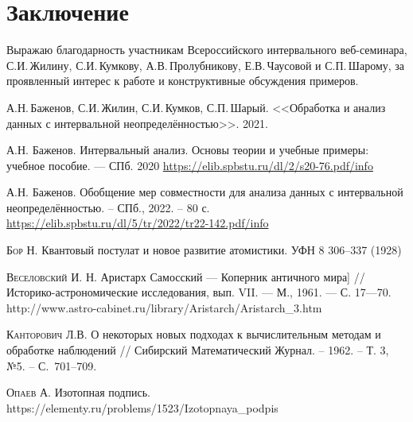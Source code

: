\documentclass[a5paper,openany]{book}
\begin{document}
\chapter*{Заключение}\label{Conclusion}


Выражаю благодарность участникам Всероссийского интервального веб-семинара, С.И.\,Жилину, С.И.\,Кумкову, А.В.\,Пролубникову, Е.В.\,Чаусовой  и С.П.\,Шарому, за проявленный интерес к работе и конструктивные обсуждения примеров. 





\begin{thebibliography}{00}


	 А.Н.\,Баженов, С.И.\,Жилин, С.И.\,Кумков, С.П.\,Шарый. <<Обработка и анализ данных с интервальной неопределённостью>>. 2021.

	А.Н. Баженов. Интервальный анализ. Основы теории и учебные примеры: учебное пособие. --- СПб. 2020
	\url{https://elib.spbstu.ru/dl/2/s20-76.pdf/info}
	
	А.Н. Баженов. Обобщение мер совместности для анализа данных с интервальной неопределённостью. – СПб., 2022. – 80 с.
	\url{https://elib.spbstu.ru/dl/5/tr/2022/tr22-142.pdf/info}

	\textsc{Бор Н.} Квантовый постулат и новое развитие атомистики. УФН 8 306–337 (1928)
	
	 \textsc{Веселовский И. Н.}
Аристарх Самосский — Коперник античного мира] // Историко-астрономические исследования, вып. VII. — М., 1961. — С. 17—70. \\
http://www.astro-cabinet.ru/library/Aristarch/Aristarch\_3.htm 
	
	
	
	\textsc{Канторович Л.В.} О некоторых новых подходах к вычислительным методам и обработке 
	наблюдений // Сибирский Математический Журнал. -- 1962. -- Т. 3, №5. -- С.~701--709. 
	
	
	\textsc{Опаев А.} Изотопная подпись. \\	
	https://elementy.ru/problems/1523/Izotopnaya\_podpis
	

\end{thebibliography}
\end{document}
